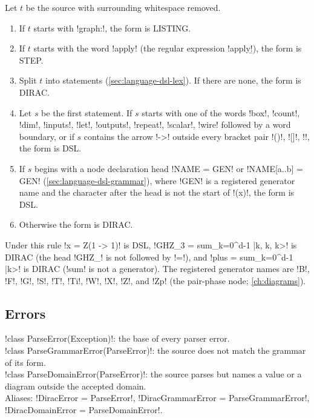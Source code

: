 \begin{algorithm}\label{alg:language-form}
\leavevmode
Let $t$ be the source with surrounding whitespace removed.
\begin{enumerate}
\item If $t$ starts with \code!graph:!, the form is LISTING.
\item If $t$ starts with the word \code!apply! (the regular expression \code!apply\b!), the form is STEP.
\item Split $t$ into statements (\cref{sec:language-dsl-lex}). If there are none, the form is DIRAC.
\item Let $s$ be the first statement. If $s$ starts with one of the words \code!box!, \code!count!, \code!dim!, \code!inputs!, \code!let!, \code!outputs!, \code!repeat!, \code!scalar!, \code!wire! followed by a word boundary, or if $s$ contains the arrow \code!->! outside every bracket pair \code!()!, \code![]!, \code!{}!, the form is DSL.
\item If $s$ begins with a node declaration head \code!NAME = GEN! or \code!NAME[a..b] = GEN! (\cref{sec:language-dsl-grammar}), where \code!GEN! is a registered generator name and the character after the head is not the start of \code!(x)!, the form is DSL.
\item Otherwise the form is DIRAC.
\end{enumerate}
\end{algorithm}

Under this rule \code!x = Z(1 -> 1)! is DSL, \code!GHZ_{3} = sum_{k=0}^{d-1} |k, k, k>! is DIRAC (the head \code!GHZ_! is not followed by \code!=!), and \code!plus = sum_{k=0}^{d-1} |k>! is DIRAC (\code!sum! is not a generator). The registered generator names are \code!B!, \code!F!, \code!G!, \code!S!, \code!T!, \code!Ti!, \code!W!, \code!X!, \code!Z!, and \code!Zp! (the pair-phase node; \cref{ch:diagrams}).

\subsection{Errors}\label{sec:language-parse-errors}

\begin{signature}
\py!class ParseError(Exception)!: the base of every parser error.\\
\py!class ParseGrammarError(ParseError)!: the source does not match the grammar of its form.\\
\py!class ParseDomainError(ParseError)!: the source parses but names a value or a diagram outside the accepted domain.\\
Aliases: \py!DiracError = ParseError!, \py!DiracGrammarError = ParseGrammarError!, \py!DiracDomainError = ParseDomainError!.
\end{signature}

